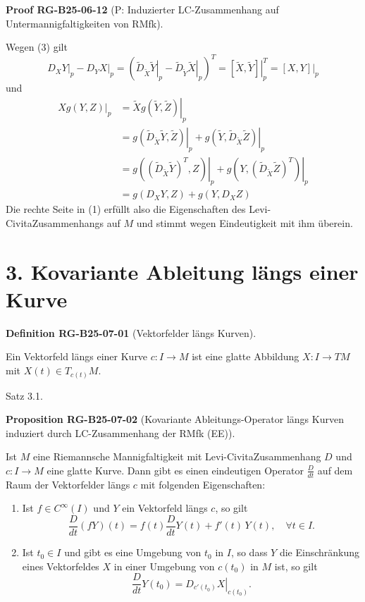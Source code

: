 \documentclass[10pt, letterpaper]{article}
\newcommand{\CustomHeading}[3]{%
  \par\medskip\noindent%
  \textbf{#1 #2} \textnormal{(#3)}.\enskip%
}
\newenvironment{DEF}[2]{\begin{unitbox}\CustomHeading{Definition}{#1}{#2}}{\end{unitbox}}
\newenvironment{PROP}[2]{\begin{unitbox}\CustomHeading{Proposition}{#1}{#2}}{\end{unitbox}}
\newenvironment{PROOF}[2]{\begin{unitbox}\CustomHeading{Proof}{#1}{#2}}{\end{unitbox}}
\begin{document}
\begin{PROOF}{RG-B25-06-12}{P: Induzierter LC-Zusammenhang auf Untermannigfaltigkeiten von RMfk}
$$$$
Wegen (3) gilt
$$\left.D_{X} Y\right|_{p} - \left.D_{Y} X\right|_{p}
= \left(\left.\tilde{D}_{\tilde{X}} \tilde{Y}\right|_{p} - \left.\tilde{D}_{\tilde{Y}} \tilde{X}\right|_{p}\right)^{T}
= \left.[\tilde{X}, \tilde{Y}]\right|_{p}^{T}
= \left.[X, Y]\right|_{p}$$
und
$$
\begin{aligned}
\left.X g(Y, Z)\right|_{p} & =\left.\tilde{X} g(\tilde{Y}, \tilde{Z})\right|_{p} \\
& =\left.g\left(\tilde{D}_{\tilde{X}} \tilde{Y}, \tilde{Z}\right)\right|_{p}+\left.g\left(\tilde{Y}, \tilde{D}_{\tilde{X}} \tilde{Z}\right)\right|_{p} \\
& =\left.g\left(\left(\tilde{D}_{\tilde{X}} \tilde{Y}\right)^{T}, Z\right)\right|_{p}+\left.g\left(Y,\left(\tilde{D}_{\tilde{X}} \tilde{Z}\right)^{T}\right)\right|_{p} \\
& =g\left(D_{X} Y, Z\right)+g\left(Y, D_{X} Z\right)
\end{aligned}
$$
Die rechte Seite in (1) erfüllt also die Eigenschaften des Levi-CivitaZusammenhangs auf $M$ und stimmt wegen Eindeutigkeit mit ihm überein.
\end{PROOF}






\pagebreak


\section*{3. Kovariante Ableitung längs einer Kurve}


\begin{DEF}{RG-B25-07-01}{Vektorfelder längs Kurven}
Ein Vektorfeld längs einer Kurve $c: I \rightarrow M$ ist eine glatte Abbildung $X: I \rightarrow T M$ mit $X(t) \in T_{c(t)} M$.
\end{DEF}


Satz 3.1. 


\begin{PROP}{RG-B25-07-02}{Kovariante Ableitungs-Operator längs Kurven induziert durch LC-Zusammenhang der RMfk (EE)}
Ist $M$ eine Riemannsche Mannigfaltigkeit mit Levi-CivitaZusammenhang $D$ und $c: I \rightarrow M$ eine glatte Kurve. Dann gibt es einen eindeutigen Operator $\frac{D}{d t}$ auf dem Raum der Vektorfelder längs $c$ mit folgenden Eigenschaften:
\begin{enumerate}
  \item Ist $f \in C^{\infty}(I)$ und $Y$ ein Vektorfeld längs $c$, so gilt
  \[
  \frac{D}{dt}(f Y)(t) = f(t) \frac{D}{dt} Y(t) + f'(t)\, Y(t), \quad \forall t \in I.
  \]
  
  \item Ist $t_0 \in I$ und gibt es eine Umgebung von $t_0$ in $I$, so dass $Y$ die Einschränkung eines Vektorfeldes $X$ in einer Umgebung von $c(t_0)$ in $M$ ist, so gilt
  \[
  \frac{D}{dt} Y(t_0) = \left. D_{c'(t_0)} X \right|_{c(t_0)}.
  \]
\end{enumerate}
\end{PROP}
\end{document}
